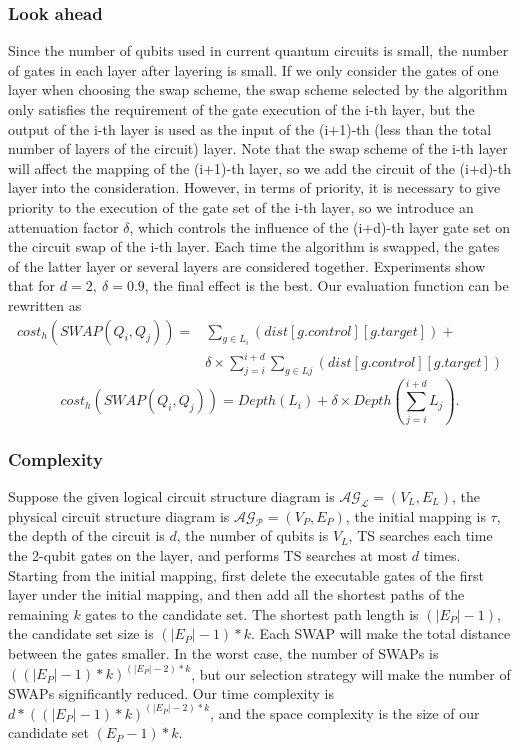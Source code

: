 \documentclass[runningheads]{llncs}
\begin{document}
\subsubsection{Look ahead }
Since the number of qubits used in current quantum circuits is small,
 the number of gates in each layer after layering is small.
If we only consider the gates of one layer when choosing the swap scheme,
the swap scheme selected by the algorithm only satisfies the requirement of the gate execution
of the i-th layer, 
but the output of the i-th layer is used as the input of the (i+1)-th
(less than the total number of layers of the circuit) layer.
Note that the swap scheme of the i-th layer will affect the mapping 
of the (i+1)-th layer, so we add the circuit of the (i+d)-th  
layer into the consideration.
However, in terms of priority, it is necessary to give priority to the 
execution of the gate set of the i-th layer, 
so we introduce an attenuation factor $\delta$, 
which controls the influence of the (i+d)-th layer gate set on the circuit 
swap of the i-th layer.
Each time the algorithm is swapped, 
the gates of the latter layer or several layers are considered together.
Experiments show that for $d=2,\ \delta=0.9$, the final effect is the best. 
Our evaluation function can be rewritten as
 \begin{equation}
	 	\begin{aligned}
			cost_{h}(SWAP(Q_{i},Q_{j}))=&\sum_{g \in L_{i}}(dist[g.control][g.target])+\\
	&\delta \times \sum_{j=i}^{i+d}\sum_{g \in L{j}}(dist[g.control][g.target])
	\label{cost_num}
	\end{aligned}
 \end{equation}
	\begin{equation}
		cost_{h}(SWAP(Q_{i},Q_{j}))= Depth(L_{i})+\delta \times Depth(\sum_{j=i}^{i+d}L_{j}).
		\label{cost_depth}
		\end{equation}
\subsubsection{Complexity}
Suppose the given logical circuit structure diagram is 
$\mathcal{AG_{L}}=(V_{L},E_{L})$, 
the physical circuit structure diagram is $\mathcal{AG_{P}}=(V_{P},E_{P})$,
the initial mapping is $\tau$, the depth of the circuit is $d$,
 the number of qubits is $V_{L}$, TS searches each time the 2-qubit gates 
 on the layer, and performs TS searches at most $d$ times.
Starting from the initial mapping, 
first delete the executable gates of the first layer under the initial mapping, 
and then add all the shortest paths of the remaining $k$ gates to the candidate set. 
The shortest path length is $(|E_{P}|-1)$, 
the candidate set size  is $(|E_{P}|-1)*k$. 
Each SWAP will make the total distance between the gates smaller. 
In the worst case, the number of SWAPs is $((|E_{P}|-1)*k)^{(|E_{P}|-2)*k}$, 
but our selection strategy will make the number of SWAPs significantly 
reduced. Our time complexity is $d*((|E_{P}|-1)*k)^{(|E_{P}|-2)*k}$, 
and the space complexity is the size of our candidate set $(E_{P}-1)*k$.
\end{document}
